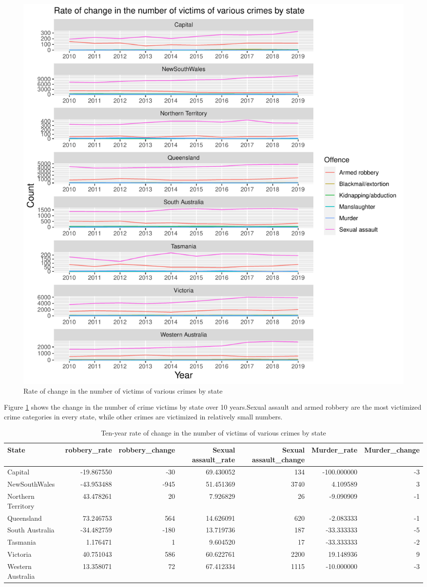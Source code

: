 \documentclass[11pt,a4paper,]{article}
\begin{document}
\begin{figure}
\centering
\includegraphics{report_files/figure-latex/plot2-1.pdf}
\caption{\label{fig:plot2}Rate of change in the number of victims of various crimes by state}
\end{figure}

Figure \ref{fig:plot2} shows the change in the number of crime victims by state over 10 years.Sexual assault and armed robbery are the most victimized crime categories in every state, while other crimes are victimized in relatively small numbers.

\begin{table}

\caption{\label{tab:table1}Ten-year rate of change in the number of victims of various crimes by state}
\centering
\begin{tabular}[t]{lrrrrrr}
\toprule
State & robbery\_rate & robbery\_change & Sexual assault\_rate & Sexual assault\_change & Murder\_rate & Murder\_change\\
\midrule
Capital & -19.867550 & -30 & 69.430052 & 134 & -100.000000 & -3\\
NewSouthWales & -43.953488 & -945 & 51.451369 & 3740 & 4.109589 & 3\\
Northern Territory & 43.478261 & 20 & 7.926829 & 26 & -9.090909 & -1\\
Queensland & 73.246753 & 564 & 14.626091 & 620 & -2.083333 & -1\\
South Australia & -34.482759 & -180 & 13.719736 & 187 & -33.333333 & -5\\
\addlinespace
Tasmania & 1.176471 & 1 & 9.604520 & 17 & -33.333333 & -2\\
Victoria & 40.751043 & 586 & 60.622761 & 2200 & 19.148936 & 9\\
Western Australia & 13.358071 & 72 & 67.412334 & 1115 & -10.000000 & -3\\
\bottomrule
\end{tabular}
\end{table}
\end{document}
